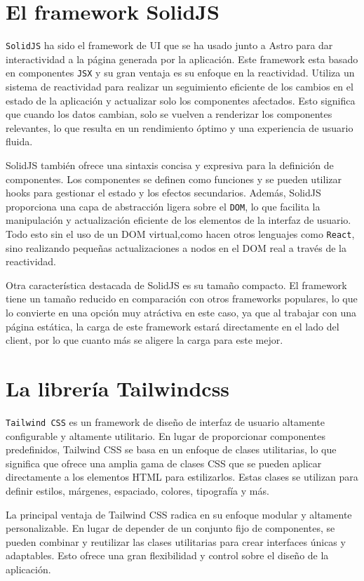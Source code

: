 \section{El framework SolidJS}
\verb|SolidJS|\cite{solid} ha sido el framework de UI que se ha usado junto a Astro para dar interactividad a la página generada por la aplicación. Este framework esta basado en componentes \verb|JSX|\cite{jsx} y su gran ventaja es su enfoque en la reactividad. Utiliza un sistema de reactividad para realizar un seguimiento eficiente de los cambios en el estado de la aplicación y actualizar solo los componentes afectados. Esto significa que cuando los datos cambian, solo se vuelven a renderizar los componentes relevantes, lo que resulta en un rendimiento óptimo y una experiencia de usuario fluida.

SolidJS también ofrece una sintaxis concisa y expresiva para la definición de componentes. Los componentes se definen como funciones y se pueden utilizar hooks para gestionar el estado y los efectos secundarios. Además, SolidJS proporciona una capa de abstracción ligera sobre el \verb|DOM|\cite{dom}, lo que facilita la manipulación y actualización eficiente de los elementos de la interfaz de usuario. Todo esto sin el uso de un DOM virtual,como hacen otros lenguajes como \verb|React|\cite{react}, sino realizando pequeñas actualizaciones a nodos en el DOM real a través de la reactividad.

Otra característica destacada de SolidJS es su tamaño compacto. El framework tiene un tamaño reducido en comparación con otros frameworks populares, lo que lo convierte en una opción muy atráctiva en este caso, ya que al trabajar con una página estática, la carga de este framework estará directamente en el lado del client, por lo que cuanto más se aligere la carga para este mejor.

\section{La librería Tailwindcss}
\verb|Tailwind CSS|\cite{tailwind} es un framework de diseño de interfaz de usuario altamente configurable y altamente utilitario. En lugar de proporcionar componentes predefinidos, Tailwind CSS se basa en un enfoque de clases utilitarias, lo que significa que ofrece una amplia gama de clases CSS que se pueden aplicar directamente a los elementos HTML para estilizarlos. Estas clases se utilizan para definir estilos, márgenes, espaciado, colores, tipografía y más.

La principal ventaja de Tailwind CSS radica en su enfoque modular y altamente personalizable. En lugar de depender de un conjunto fijo de componentes, se pueden combinar y reutilizar las clases utilitarias para crear interfaces únicas y adaptables. Esto ofrece una gran flexibilidad y control sobre el diseño de la aplicación.

